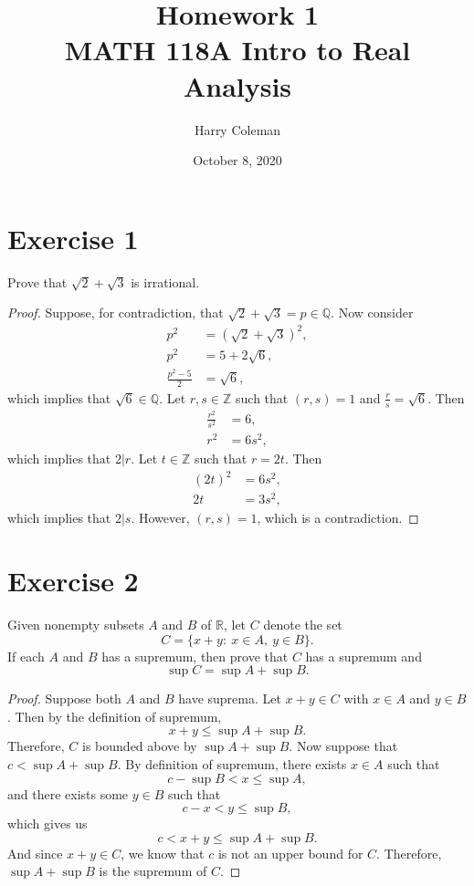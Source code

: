 \documentclass[12pt]{article}
\newenvironment{problem}
    {\begin{lrbox}{\mybox}\begin{minipage}{\textwidth-10pt}}
    {\end{minipage}\end{lrbox}\framebox[6.5in]{\usebox{\mybox}}}
\newcommand{\ds}{\displaystyle}
\newcommand{\Z}{\mathbb{Z}}
\newcommand{\Q}{\mathbb{Q}}
\begin{document}
 
\title{Homework 1\\
    \large MATH 118A Intro to Real Analysis
}
\author{Harry Coleman}
\date{October 8, 2020}
\maketitle

\section*{Exercise 1}
\begin{problem}
    Prove that $\sqrt{2} + \sqrt{3}$ is irrational.
\end{problem}

\begin{proof}
    Suppose, for contradiction, that $\sqrt{2} + \sqrt{3} = p \in\Q$. Now consider
    \begin{align*}
        p^2 &= (\sqrt{2} + \sqrt{3})^2, \\
        p^2 &= 5 + 2\sqrt{6}, \\
        \frac{p^2-5}2 &= \sqrt{6},
    \end{align*}
    which implies that $\sqrt{6}\in\Q$. Let $r,s\in\Z$ such that $(r,s)=1$ and $\ds\frac{r}{s} = \sqrt6$. Then
    \begin{align*}
        \frac{r^2}{s^2} &= 6, \\
        r^2 &= 6s^2,
    \end{align*}
    which implies that $2|r$. Let $t\in\Z$ such that $r=2t$. Then
    \begin{align*}
        (2t)^2 &= 6s^2, \\
        2t &= 3s^2,
    \end{align*}
    which implies that $2|s$. However, $(r,s)=1$, which is a contradiction.
     
\end{proof}

\newpage
\section*{Exercise 2}
\begin{problem}
    Given nonempty subsets $A$ and $B$ of $\mathbb{R}$, let $C$ denote the set
    \[
     C = \{ x+y:\ x \in A,\ y\in B\}.
    \]
    If each $A$ and $B$ has a supremum, then prove that $C$ has a supremum and 
    \[
     \sup C = \sup A + \sup B.
    \]
\end{problem}

\begin{proof}
    Suppose both $A$ and $B$ have suprema. Let $x+y\in C$ with $x\in A$ and $y\in B$. Then by the definition of supremum,
    \[x+y \leq \sup A + \sup B.\]
    Therefore, $C$ is bounded above by $\sup A + \sup B$. Now suppose that $c<\sup A + \sup B$. By definition of supremum, there exists $x\in A$ such that
    \[c-\sup B < x \leq \sup A,\]
    and there exists some $y\in B$ such that
    \[c-x < y \leq \sup B,\]
    which gives us
    \[c < x + y \leq \sup A + \sup B.\]
    And since $x+y\in C$, we know that $c$ is not an upper bound for $C$. Therefore, $\sup A + \sup B$ is the supremum of $C$.
    
\end{proof}
\end{document}

